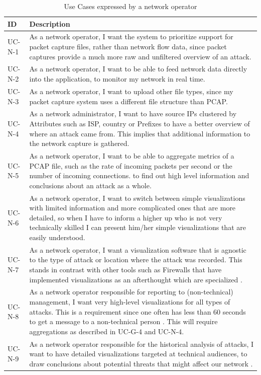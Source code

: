\begin{table}[]
\centering
\begin{tabular}{|p{1.6cm}|p{12cm}|}
\hline
\textbf{ID} & \textbf{Description} \\ \hline

UC-N-1         & As a network operator, I want the system to prioritize support for packet capture files, rather than network flow data, since packet captures provide a much more raw and unfiltered overview of an attack. \\ \hline
UC-N-2        & As a network operator, I want to be able to feed network data directly into the application, to monitor my network in real time.\\ \hline
UC-N-3        & As a network operator, I want to upload other file types, since my packet capture system uses a different file structure than PCAP.\\ \hline
UC-N-4        & As a network administrator, I want to have source IPs clustered by Attributes such as ISP, country or Prefixes to have a better overview of where an attack came from. This implies that additional information to the network capture is gathered.\\ \hline
UC-N-5         & As a network operator, I want to be able to aggregate metrics of a PCAP file, such as the rate of incoming packets per second or the number of incoming connections. to find out high level information and conclusions about an attack as a whole.\\ \hline
UC-N-6        & As a network operator, I want to switch between simple visualizations with limited information and more complicated ones that are more detailed, so when I have to inform a higher up who is not very technically skilled I can present him/her simple visualizations that are easily understood.\\ \hline
UC-N-7       & As a network operator, I want a visualization software that is agnostic to the type of attack or location where the attack was recorded. This stands in contrast with other tools such as Firewalls that have implemented visualizations as an afterthought which are specialized \cite{appliedsecurityvisualization}.\\ \hline
UC-N-8       & As a network operator responsible for reporting to (non-technical) management, I want very high-level visualizations for all types of attacks. This is a requirement since one often has less than 60 seconds to get a message to a non-technical person \cite{appliedsecurityvisualization}. This will require aggregations as described in UC-G-4 and UC-N-4. \\ \hline
UC-N-9       & As a network operator responsible for the historical analysis of attacks, I want to have detailed visualizations targeted at technical audiences, to draw conclusions about potential threats that might affect our network \cite{appliedsecurityvisualization}.\\ \hline

\end{tabular}
\caption{Use Cases expressed by a network operator}
\label{table:us-operator}
\end{table} 

